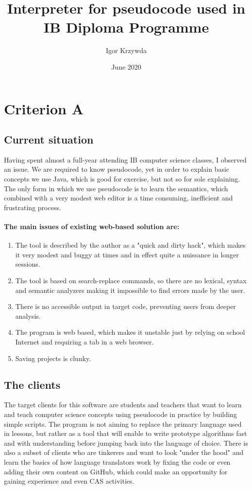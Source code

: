 \documentclass[10pt,a4paper,draft]{report}
\begin{document}
\title{Interpreter for pseudocode used in IB Diploma Programme}
\author{Igor Krzywda}
\date{June 2020}
\maketitle

\section{Criterion A}
\subsection{Current situation}
Having spent almost a full-year attending IB computer science classes, I observed an issue. We are required to know pseudocode, yet in order to explain basic concepts we use Java,
which is good for exercise, but not so for sole explaining. The only form in which we use pseudocode is to learn the semantics, which combined with a very modest web editor is a
time consuming, inefficient and frustrating process. 
\paragraph{The main issues of existing web-based solution are:}
\begin{enumerate}
\item
The tool is described by the author as a "quick and dirty hack", which makes it very modest and buggy at times and in effect quite a nuissance in longer sessions.
\item
The tool is based on search-replace commands, so there are no lexical, syntax and semantic analyzers making it impossible to find errors made by the user.
\item
There is no accessible output in target code, preventing users from deeper analysis.
\item
The program is web based, which makes it unstable just by relying on school Internet and requiring a tab in a web browser.
\item
Saving projects is clunky.
\end{enumerate}

\subsection{The clients}
The target clients for this software are students and teachers that want to learn and teach computer science concepts using pseudocode in practice by building simple scripts.
The program is not aiming to replace the primary language used in lessons, but rather as a tool that will enable to write prototype algorithms fast and with understanding 
before jumping back into the language of choice. There is also a subset of clients who are tinkerers and want to look "under the hood" and learn the basics of how language 
translators work by fixing the code or even adding their own content on GitHub, which could make an opportunity for gaining experience and even CAS activities.
\end{document}
